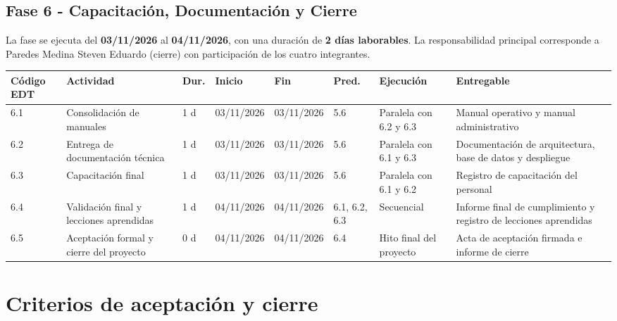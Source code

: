 \documentclass[12pt,a4paper]{article}
\begin{document}
\begin{landscape}
\subsection{Fase 6 - Capacitación, Documentación y Cierre}

La fase se ejecuta del \textbf{03/11/2026} al \textbf{04/11/2026}, con una duración de \textbf{2 días laborables}. 
La responsabilidad principal corresponde a Paredes Medina Steven Eduardo (cierre) con participación de los cuatro integrantes.

\begin{center}
\setlength{\tabcolsep}{3pt}
\renewcommand{\arraystretch}{1.15}
\fontsize{7.2}{8.5}\selectfont
\begin{tabularx}{\linewidth}{|p{0.85cm}|p{4.0cm}|p{0.75cm}|p{1.45cm}|p{1.45cm}|p{1.4cm}|p{4.0cm}|X|}
\hline
\rowcolor{tableheader}
\textbf{Código EDT} & \textbf{Actividad} & \textbf{Dur.} & \textbf{Inicio} & \textbf{Fin} & \textbf{Pred.} & \textbf{Ejecución} & \textbf{Entregable} \\ \hline
6.1 & Consolidación de manuales & 1 d & 03/11/2026 & 03/11/2026 & 5.6 & Paralela con 6.2 y 6.3 & Manual operativo y manual administrativo \\ \hline
6.2 & Entrega de documentación técnica & 1 d & 03/11/2026 & 03/11/2026 & 5.6 & Paralela con 6.1 y 6.3 & Documentación de arquitectura, base de datos y despliegue \\ \hline
6.3 & Capacitación final & 1 d & 03/11/2026 & 03/11/2026 & 5.6 & Paralela con 6.1 y 6.2 & Registro de capacitación del personal \\ \hline
6.4 & Validación final y lecciones aprendidas & 1 d & 04/11/2026 & 04/11/2026 & 6.1, 6.2, 6.3 & Secuencial & Informe final de cumplimiento y registro de lecciones aprendidas \\ \hline
6.5 & Aceptación formal y cierre del proyecto & 0 d & 04/11/2026 & 04/11/2026 & 6.4 & Hito final del proyecto & Acta de aceptación firmada e informe de cierre \\ \hline
\end{tabularx}
\end{center}
\end{landscape}



\section{Criterios de aceptación y cierre}
\end{document}
